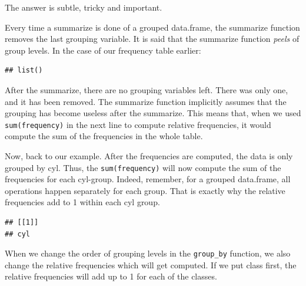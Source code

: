 \documentclass[]{tufte-book}
\newenvironment{Shaded}{}{}
\newcommand{\DataTypeTok}[1]{\textcolor[rgb]{0.56,0.13,0.00}{#1}}
\newcommand{\KeywordTok}[1]{\textcolor[rgb]{0.00,0.44,0.13}{\textbf{#1}}}
\newcommand{\NormalTok}[1]{#1}
\newcommand{\OperatorTok}[1]{\textcolor[rgb]{0.40,0.40,0.40}{#1}}
\newcommand{\StringTok}[1]{\textcolor[rgb]{0.25,0.44,0.63}{#1}}
\begin{document}
The answer is subtle, tricky and important.

Every time a summarize is done of a grouped data.frame, the summarize function removes the last grouping variable. It is said that the summarize function \emph{peels} of group levels. In the case of our frequency table earlier:

\begin{Shaded}
\end{Shaded}

\begin{verbatim}
## list()
\end{verbatim}

After the summarize, there are no grouping variables left. There was only one, and it has been removed. The summarize function implicitly assumes that the grouping has become useless after the summarize. This means that, when we used \texttt{sum(frequency)} in the next line to compute relative frequencies, it would compute the sum of the frequencies in the whole table.

Now, back to our example. After the frequencies are computed, the data is only grouped by cyl. Thus, the \texttt{sum(frequency)} will now compute the sum of the frequencies for each cyl-group. Indeed, remember, for a grouped data.frame, all operations happen separately for each group. That is exactly why the relative frequencies add to 1 within each cyl group.

\begin{Shaded}
\end{Shaded}

\begin{verbatim}
## [[1]]
## cyl
\end{verbatim}

When we change the order of grouping levels in the \texttt{group\_by} function, we also change the relative frequencies which will get computed. If we put class first, the relative frequencies will add up to 1 for each of the classes.
\end{document}
